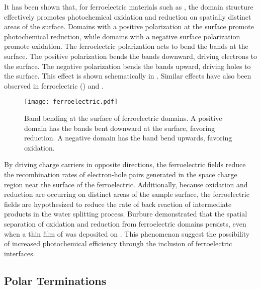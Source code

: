 It has been shown that, for ferroelectric materials such as , the domain structure effectively promotes photochemical oxidation and reduction on spatially distinct areas of the surface. \cite{Giocondi:2001gz,Burbure:2010go,Giocondi:2003ub,Giocondi:2001bi} Domains with a positive polarization at the surface promote photochemical reduction, while domains with a negative surface polarization promote oxidation. The ferroelectric polarization acts to bend the bands at the surface. The positive polarization bends the bands downward, driving electrons to the surface. The negative polarization bends the bands upward, driving holes to the surface. This effect is shown schematically in . Similar effects have also been observed in ferroelectric  () and .\cite{Hanson:2006bq,Kalinin:2002iw,Tiwari:2009jv}

\begin{figure}
	\centerline{\texttt{[image: ferroelectric.pdf]}}
	\caption[Band bending at the surface of ferroelectric domains]{%
		Band bending at the surface of ferroelectric domains. A positive 
		domain has the bands bent downward at the surface, favoring 
		reduction. A negative domain has the band bend upwards, favoring 
		oxidation.}
	\label{fig:ferroelectric}
\end{figure}

By driving charge carriers in opposite directions, the ferroelectric fields reduce the recombination rates of electron-hole pairs generated in the space charge region near the surface of the ferroelectric. Additionally, because oxidation and reduction are occurring on distinct areas of the sample surface, the ferroelectric fields are hypothesized to reduce the rate of back reaction of intermediate products in the water splitting process. Burbure\cite{Burbure:2010go,Burbure:2006cq,Burbure:2010ti} demonstrated that the spatial separation of oxidation and reduction from ferroelectric domains persists, even when a thin film of  was deposited on . This phenomenon suggest the possibility of increased photochemical efficiency through the inclusion of ferroelectric interfaces.


\subsection{Polar Terminations}
\label{subsec:background.polarterms}


